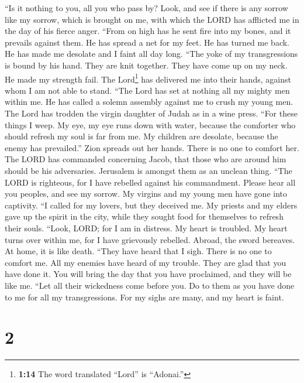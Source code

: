 ``Is it nothing to you, all you who pass by? Look, and see if there is
any sorrow like my sorrow, which is brought on me, with which the LORD
has afflicted me in the day of his fierce anger.  ``From
on high has he sent fire into my bones, and it prevails against them. He
has spread a net for my feet. He has turned me back. He has made me
desolate and I faint all day long.  ``The yoke of my
transgressions is bound by his hand. They are knit together. They have
come up on my neck. He made my strength fail. The Lord\footnote{\textbf{1:14}
  The word translated ``Lord'' is ``Adonai.''} has delivered me into
their hands, against whom I am not able to stand.  ``The
Lord has set at nothing all my mighty men within me. He has called a
solemn assembly against me to crush my young men. The Lord has trodden
the virgin daughter of Judah as in a wine press.  ``For
these things I weep. My eye, my eye runs down with water, because the
comforter who should refresh my soul is far from me. My children are
desolate, because the enemy has prevailed.''  Zion
spreads out her hands. There is no one to comfort her. The LORD has
commanded concerning Jacob, that those who are around him should be his
adversaries. Jerusalem is amongst them as an unclean thing.
 ``The LORD is righteous, for I have rebelled against his
commandment. Please hear all you peoples, and see my sorrow. My virgins
and my young men have gone into captivity.  ``I called
for my lovers, but they deceived me. My priests and my elders gave up
the spirit in the city, while they sought food for themselves to refresh
their souls.  ``Look, LORD; for I am in distress. My
heart is troubled. My heart turns over within me, for I have grievously
rebelled. Abroad, the sword bereaves. At home, it is like death.
 ``They have heard that I sigh. There is no one to
comfort me. All my enemies have heard of my trouble. They are glad that
you have done it. You will bring the day that you have proclaimed, and
they will be like me.  ``Let all their wickedness come
before you. Do to them as you have done to me for all my transgressions.
For my sighs are many, and my heart is faint.

\hypertarget{section-1}{%
\section{2}\label{section-1}}

